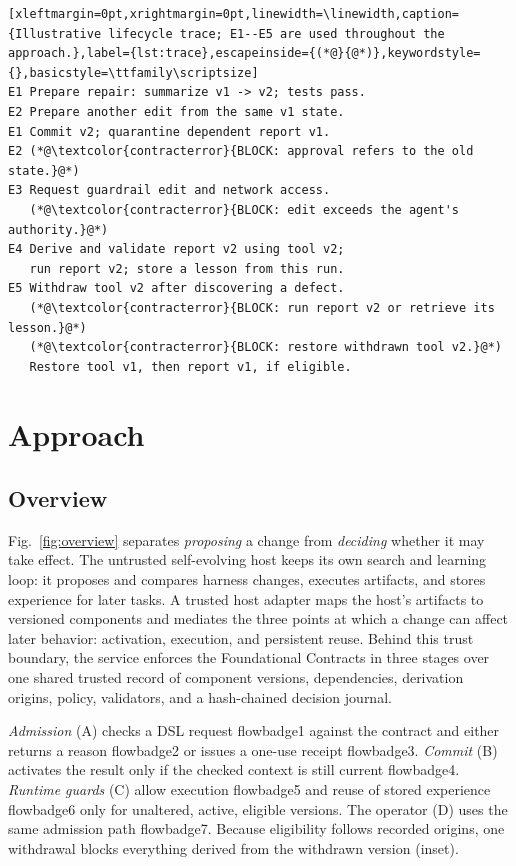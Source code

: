 \documentclass[letterpaper,journal]{IEEEtran}
\DeclareRobustCommand{\circled}[1]{\expandafter\usebox\csname flowbadge#1\endcsname}
\begin{document}
\noindent\begin{minipage}{\columnwidth}
\begin{lstlisting}[xleftmargin=0pt,xrightmargin=0pt,linewidth=\linewidth,caption={Illustrative lifecycle trace; E1--E5 are used throughout the approach.},label={lst:trace},escapeinside={(*@}{@*)},keywordstyle={},basicstyle=\ttfamily\scriptsize]
E1 Prepare repair: summarize v1 -> v2; tests pass.
E2 Prepare another edit from the same v1 state.
E1 Commit v2; quarantine dependent report v1.
E2 (*@\textcolor{contracterror}{BLOCK: approval refers to the old state.}@*)
E3 Request guardrail edit and network access.
   (*@\textcolor{contracterror}{BLOCK: edit exceeds the agent's authority.}@*)
E4 Derive and validate report v2 using tool v2;
   run report v2; store a lesson from this run.
E5 Withdraw tool v2 after discovering a defect.
   (*@\textcolor{contracterror}{BLOCK: run report v2 or retrieve its lesson.}@*)
   (*@\textcolor{contracterror}{BLOCK: restore withdrawn tool v2.}@*)
   Restore tool v1, then report v1, if eligible.
\end{lstlisting}
\end{minipage}


\section{Approach}\label{sec:approach}
\subsection{Overview}
Fig.~\ref{fig:overview} separates \emph{proposing} a change from \emph{deciding} whether it may take effect. The untrusted self-evolving host keeps its own search and learning loop: it proposes and compares harness changes, executes artifacts, and stores experience for later tasks. A trusted host adapter maps the host's artifacts to versioned components and mediates the three points at which a change can affect later behavior: activation, execution, and persistent reuse. Behind this trust boundary, the service enforces the Foundational Contracts in three stages over one shared trusted record of component versions, dependencies, derivation origins, policy, validators, and a hash-chained decision journal.

\emph{Admission} (A) checks a DSL request \circled{1} against the contract and either returns a reason \circled{2} or issues a one-use receipt \circled{3}. \emph{Commit} (B) activates the result only if the checked context is still current \circled{4}. \emph{Runtime guards} (C) allow execution \circled{5} and reuse of stored experience \circled{6} only for unaltered, active, eligible versions. The operator (D) uses the same admission path \circled{7}. Because eligibility follows recorded origins, one withdrawal blocks everything derived from the withdrawn version (inset).
\end{document}
